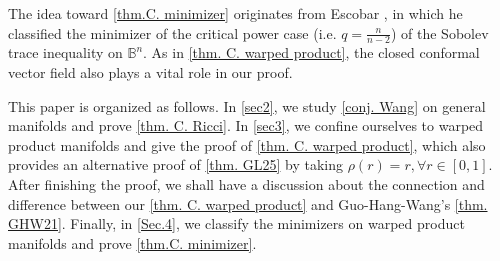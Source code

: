 \documentclass[12pt]{amsart}%
\numberwithin{equation}{section}
\numberwithin{lemma}{section}
\numberwithin{proposition}{section}
\numberwithin{corollary}{section}
\numberwithin{remark}{section}
\begin{document}
    The idea toward \cref{thm.C. minimizer}  originates from Escobar \cite[Theorem 2]{Esc88}, in which he classified the minimizer of the critical power case (i.e. $q=\frac{n}{n-2}$) of the Sobolev trace inequality on $\mathbb{B}^n$. 
    As in \cref{thm. C. warped product}, the closed conformal vector field also  plays a vital role in our proof.

    This paper is organized as follows. In \cref{sec2}, we study \cref{conj. Wang} on general manifolds and prove \cref{thm. C. Ricci}. In \cref{sec3}, we confine ourselves to warped product manifolds and give the proof of \cref{thm. C. warped product}, which also provides an alternative proof of \cref{thm. GL25} by taking $\rho(r)=r,\forall r\in[0,1]$. After finishing the proof, we shall have a discussion about the connection and difference between our \cref{thm. C. warped product} and Guo-Hang-Wang's \cref{thm. GHW21}.
    Finally, in \cref{Sec.4}, we classify the minimizers on warped product manifolds and prove \cref{thm.C. minimizer}. 
 
\end{document}
